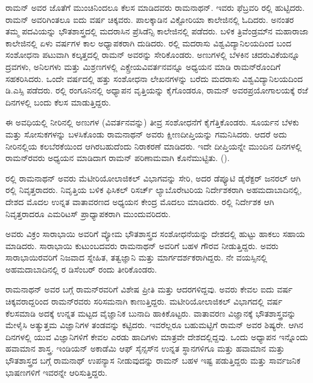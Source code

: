 ರಾಮನ್ ಅವರ ಜೊತೆಗೆ ಮುಂಚಿನಿಂದಲೂ ಕೆಲಸ ಮಾಡಿದವರು ರಾಮನಾಥನ್. ಇವರು ಫೆಬ್ರವರಿ ರಲ್ಲಿ ಹುಟ್ಟಿದರು. ರಾಮನ್ ಅವರಿಗಿಂತಲೂ ಐದು ವರ್ಷ ಚಿಕ್ಕವರು. ಪಾಲಕ್ಕಾಡಿನ ವಿಕ್ಟೋರಿಯಾ ಕಾಲೇಜಿನಲ್ಲಿ ಓದಿದರು. ಅನಂತರ ತಮ್ಮ ಪದವಿಯನ್ನು ಭೌತಶಾಸ್ತ್ರದಲ್ಲಿ ಮದರಾಸಿನ ಪ್ರೆಸಿಡೆನ್ಸಿ ಕಾಲೇಜಿನಲ್ಲಿ ಪಡೆದರು. ಬಳಿಕ ತ್ರಿವೆಂಡ್ರಮ್‍ನ ಮಹಾರಾಜಾ ಕಾಲೇಜಿನಲ್ಲಿ ಏಳು ವರ್ಷಗಳ ಕಾಲ ಅಧ್ಯಾಪಕರಾಗಿ ದುಡಿದರು. ರಲ್ಲಿ ಮದರಾಸು ವಿಶ್ವವಿದ್ಯಾನಿಲಯದಿಂದ ಬಂದ ಸಂಶೋಧನಾ ಪಟುವಾಗಿ ಕಲ್ಕತ್ತದಲ್ಲಿ ರಾಮನ್ ಅವರನ್ನು ಸೇರಿಕೊಂಡರು. ಅಣುಗಳಲ್ಲಿ ಬೆಳಕಿನ ಚದರುವಿಕೆಯನ್ನೂ ದ್ರವಗಳು, ಅನಿಲಗಳು ಮತ್ತು ಮಿಶ್ರಣಗಳಲ್ಲಿ ಎಕ್ಸ್\enginline{-}ರೇಯ\break ವಿವರ್ತನವನ್ನೂ ಅಧ್ಯಯನ ಮಾಡಿ ರಾಮನ್‍ರೊಂದಿಗೆ ಸಹಕರಿಸಿದರು. ಒಂದೇ ವರ್ಷದಲ್ಲಿ ಹತ್ತು ಸಂಶೋಧನಾ ಲೇಖನಗಳನ್ನು ಬರೆದು ಮದರಾಸು ವಿಶ್ವವಿದ್ಯಾನಿಲಯದಿಂದ ಡಿ.ಎಸ್ಸಿ ಪಡೆದರು. ರಲ್ಲಿ ರಂಗೂನಿನಲ್ಲಿ ಅಧ್ಯಾಪನ ವೃತ್ತಿಯನ್ನು ಕೈಗೊಂಡರೂ, ರಾಮನ್ ಅವರ\break ಪ್ರಯೋಗಾಲಯಕ್ಕೆ ರಜೆ ದಿನಗಳಲ್ಲಿ ಬಂದು ಕೆಲಸ ಮಾಡುತ್ತಿದ್ದರು.

ಈ ಅವಧಿಯಲ್ಲಿ ನೀರಿನಲ್ಲಿ ಅಣುಗಳ (ವಿವರ್ತನವನ್ನು) ತೀವ್ರ ಸಂಶೋಧನೆಗೆ ಕೈಗೆತ್ತಿಕೊಂಡರು. ಸೂರ್ಯನ ಬೆಳಕು ಮತ್ತು ಸೋಸುಕಗಳನ್ನು ಬಳಸಿಕೊಂಡು ರಾಮನಾಥನ್ ಅವರು ಕ್ಷೀಣ\break ದೀಪ್ತಿಯನ್ನು ಗಮನಿಸಿದರು. ಆದರೆ ಅದು ನೀರಿನಲ್ಲಿಯ ಕಲಬೆರಕೆಯಿಂದ ಆಗಿರಬಹುದೆಂದು ನಿರಾಕರಣೆ ಮಾಡಿದರು. ಇದೇ ದೀಪ್ತಿಯನ್ನೇ ಮುಂದಿನ ದಿನಗಳಲ್ಲಿ ರಾಮನ್‍ರವರು ಅಧ್ಯಯನ ಮಾಡಿದಾಗ ರಾಮನ್ ಪರಿಣಾಮವಾಗಿ ಕೊನೆಮುಟ್ಟಿತು. ().

ರಲ್ಲಿ ರಾಮನಾಥನ್ ಅವರು ಮೆಟೀರಿಯೋಲಾಜಿಕಲ್ ವಿಭಾಗವನ್ನು ಸೇರಿ, ಅದರ ಡೆಪ್ಯೂಟಿ ಡೈರೆಕ್ಟರ್ ಜನರಲ್ ಆಗಿ ರಲ್ಲಿ ನಿವೃತ್ತರಾದರು. ನಿವೃತ್ತಿಯ ಬಳಿಕ ಫಿಸಿಕಲ್ ರಿಸರ್ಚ್ ಲ್ಯಾಬೊರೇಟರಿಯ ನಿರ್ದೇಶಕರಾಗಿ ಅಹಮದಾಬಾದಿನಲ್ಲಿ, ದೇಶದ ಮೊದಲ ಉನ್ನತ ವಾತಾವರಣದ ಅಧ್ಯಯನ ಕೇಂದ್ರ ಮೊದಲು ಮಾಡಿದರು. ರಲ್ಲಿ ನಿರ್ದೇಶಕ ಆಗಿ ನಿವೃತ್ತರಾದರೂ ಎಮರಿಟಸ್ ಪ್ರಾಧ್ಯಾಪಕರಾಗಿ ಮುಂದುವರಿದರು.

ಅವರು ವಿಕ್ರಂ ಸಾರಾಭಾಯಿ ಅವರಿಗೆ ವ್ಯೋಮ ಭೌತಶಾಸ್ತ್ರದ ಸಂಶೋಧನೆಯನ್ನು ದೇಶದಲ್ಲಿ ಹುಟ್ಟು ಹಾಕಲು ಸಹಾಯ ಮಾಡಿದರು. ಸಾರಾಭಾಯಿ ಕುಟುಂಬದವರು ರಾಮನಾಥನ್ ಅವರಿಗೆ ಬಹಳ ಗೌರವ ನೀಡುತ್ತಿದ್ದರು. ಅವರು ಸಾರಾಭಾಯಿರವರಿಗೆ ನಿಜವಾದ ಸ್ನೇಹಿತ, ತತ್ವಜ್ಞಾನಿ ಮತ್ತು ಮಾರ್ಗದರ್ಶಕರಾಗಿದ್ದರು. ನೇ ವಯಸ್ಸಿನಲ್ಲಿ ಅಹಮದಾಬಾದಿನಲ್ಲಿ ರ ಡಿಸೆಂಬರ್ ರಂದು ತೀರಿಕೊಂಡರು.

ರಾಮನಾಥನ್ ಅವರ ಬಗ್ಗೆ ರಾಮನ್‍ರವರಿಗೆ ವಿಶೇಷ ಪ್ರೀತಿ ಮತ್ತು ಆದರಗಳಿದ್ದವು. ಅವರು ಕೇವಲ ಐದು ವರ್ಷ ಚಿಕ್ಕವರಾದ್ದರಿಂದ ರಾಮನ್‍ರವರು ಸರಿಸಮನಾಗಿ ಕಾಣುತ್ತಿದ್ದರು. ಮಟೀರಿಯೋ\-ಲಾಜಿಕಲ್ ವಿಭಾಗದಲ್ಲಿ  ವರ್ಷ ಕೆಲಸಮಾಡಿ ಅದಕ್ಕೆ ಉನ್ನತ ಮಟ್ಟದ ವೈಜ್ಞಾನಿಕ ಬುನಾದಿ ಹಾಕಿಕೊಟ್ಟರು. ವಾತಾವರಣ ವಿಜ್ಞಾನಕ್ಕೆ ಭೌತಶಾಸ್ತ್ರವನ್ನು ಮೇಳೈಸಿ ಅತ್ಯುತ್ತಮ ವಿಜ್ಞಾನಿಗಳ ತಂಡವನ್ನು ಕಟ್ಟಿದರು. ಇವರೆಲ್ಲರೂ ಬಹುಮಟ್ಟಿಗೆ ರಾಮನ್ ಅವರ ಶಿಷ್ಯರೇ. ಆಗಿನ ದಿನಗಳಲ್ಲಿ ಯುವ ವಿಜ್ಞಾನಿಗಳಿಗೆ ಕೇವಲ ಎರಡು ಹಾದಿಗಳು ಮಾತ್ರವೇ ದೇಶದಲ್ಲಿದ್ದವು. ಒಂದು ಅಧ್ಯಾಪನ ಇನ್ನೊಂದು ಹವಾಮಾನ ಶಾಸ್ತ್ರ. ಇಂಡಿಯನ್ ಅಕಾಡೆಮಿ ಆಫ್ ಸೈನ್ಸಸ್‍ನ ಉನ್ನತ ಸ್ಥಾನಗಳಿಗೂ ಮತ್ತು ಹವಾಮಾನ ಮತ್ತು ಭೌತಶಾಸ್ತ್ರದ ಬಗ್ಗೆ ರಾಮನಾಥ್ ಉಪನ್ಯಾಸ ನೀಡುವುದನ್ನು ರಾಮನ್ ಬಹಳ ಇಷ್ಟ ಪಡುತ್ತಿದ್ದರು ಮತ್ತು ಸಾರ್ವಜನಿಕ ಭಾಷಣಗಳಿಗೆ ಇವರನ್ನೇ ಆರಿಸುತ್ತಿದ್ದರು.

